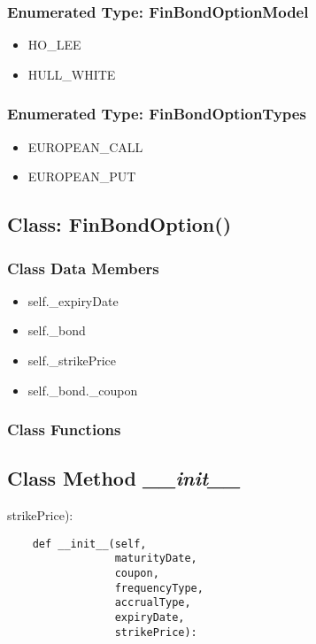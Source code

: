\documentclass[twoside,11pt]{book}
\begin{document}
\subsubsection{Enumerated Type: FinBondOptionModel}
\begin{itemize}
\item{HO\_LEE}
\item{HULL\_WHITE}
\end{itemize}

\subsubsection{Enumerated Type: FinBondOptionTypes}
\begin{itemize}
\item{EUROPEAN\_CALL}
\item{EUROPEAN\_PUT}
\end{itemize}

\subsection{Class: FinBondOption()}


\subsubsection{Class Data Members}
\begin{itemize}
\item{self.\_expiryDate}
\item{self.\_bond}
\item{self.\_strikePrice}
\item{self.\_bond.\_coupon}
\end{itemize}

\subsubsection{Class Functions}

\subsection{Class Method {\it \_\_init\_\_}}
strikePrice):

\begin{lstlisting}
    def __init__(self,
                 maturityDate,
                 coupon,
                 frequencyType,
                 accrualType,
                 expiryDate,
                 strikePrice):
\end{lstlisting}
\end{document}

